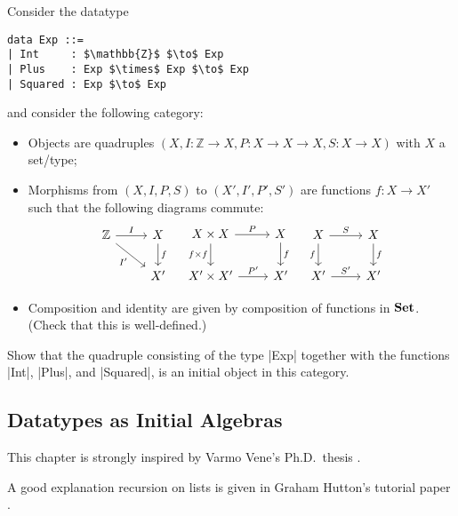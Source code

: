 \begin{exer}
  Consider the datatype
\begin{lstlisting}[mathescape=true]
data Exp ::=
| Int     : $\mathbb{Z}$ $\to$ Exp
| Plus    : Exp $\times$ Exp $\to$ Exp
| Squared : Exp $\to$ Exp
\end{lstlisting}
  and consider the following category:
  \begin{itemize}
  \item Objects are quadruples $(X, I : \mathbb{Z} \to X, P : X \to X \to X, S : X \to X)$ with $X$ a set/type;
  \item Morphisms from $(X, I, P, S)$ to $(X', I', P', S')$ are functions
    $f : X \to X'$ such that the following diagrams commute:
    \[
      \begin{tikzcd}
        \mathbb{Z} \ar[r, "I"] \ar[rd, "I'"']
        &
        X \ar[d, "f"]
        \\
        &
        X'
      \end{tikzcd}
      \quad
      \begin{tikzcd}
        X\times X \ar[r, "P"] \ar[d, "f \times f"']
        &
        X \ar[d, "f"]
        \\
        X' \times X' \ar[r, "P'"]
        &
        X'
      \end{tikzcd}
      \quad
      \begin{tikzcd}
        X \ar[r, "S"] \ar[d, "f"']
        &
        X \ar[d, "f"]
        \\
        X' \ar[r, "S'"]
        &
        X'
      \end{tikzcd}
    \]
  \item Composition and identity are given by composition of functions in $\mathbf{Set}$. (Check that this is well-defined.)
  \end{itemize}
  
    Show that the quadruple consisting of the type |Exp| together with the functions |Int|, |Plus|, and |Squared|, is an initial object in this category.
\end{exer}

\subsection{Datatypes as Initial Algebras}
\label{sec:datatypes-as-initial}



\begin{reading*}
  This chapter is strongly inspired by Varmo Vene's Ph.D.\ thesis \cite[Chapter 2]{vene_phd}.

  A good explanation recursion on lists is given in Graham Hutton's tutorial paper \cite{DBLP:journals/jfp/Hutton99}.
\end{reading*}

